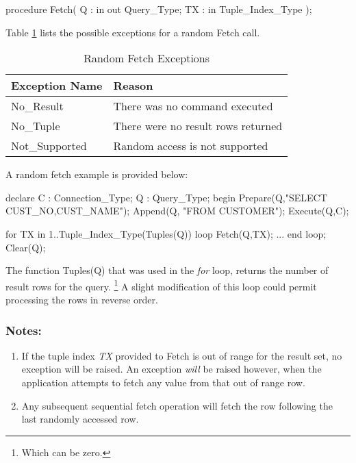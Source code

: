 \documentclass[english,letterpaper]{book}
\begin{document}
\begin{Code}
procedure Fetch(
   Q :  in out Query_Type;
   TX : in     Tuple_Index_Type
);
\end{Code}

Table \ref{t:rfchx} lists the possible exceptions for
a random Fetch call.

\begin{table}
   \begin{center}
      \begin{tabular}{ll}
         Exception Name    &  Reason\\
         \hline 
         No\_Result        &  There was no command executed\\
         No\_Tuple         &  There were no result rows returned\\
         Not\_Supported    &  Random access is not supported\\
      \end{tabular}
   \end{center}
   \caption{Random Fetch Exceptions}\label{t:rfchx}
\end{table}

A random fetch example is provided below:\label{Random Fetch Example}

\begin{Example}
declare
   C : Connection_Type;
   Q : Query_Type;
begin
   Prepare(Q,"SELECT CUST_NO,CUST_NAME");
   Append(Q, "FROM CUSTOMER");
   Execute(Q,C);

   for TX in 1..Tuple_Index_Type(Tuples(Q)) loop
      Fetch(Q,TX);
      ...
   end loop;
   Clear(Q);
\end{Example}

The function Tuples(Q) that was used in the \emph{for} loop, returns
the number of result rows for the query.%
\footnote{Which can be zero.%
} A slight modification of this loop could permit processing the rows
in reverse order.


\subsubsection{Notes:}

\begin{enumerate}
   \item If the tuple index \emph{TX} provided to Fetch is out
         of range for the result set, no exception will be raised. An exception
         \emph{will} be raised however, when the application attempts to fetch
         any value from that out of range row.
   \item Any subsequent sequential fetch operation will fetch the row following
         the last randomly accessed row.
\end{enumerate}
\end{document}
